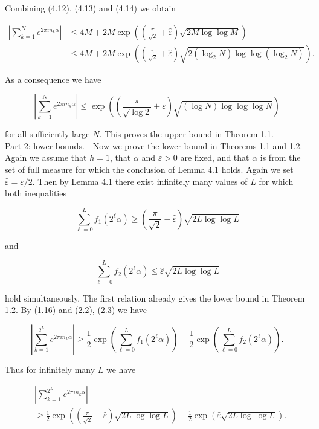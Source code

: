\documentclass[10pt]{article}
\begin{document}
Combining (4.12), (4.13) and (4.14) we obtain

$$
\begin{aligned}
\left|\sum_{k=1}^{N} e^{2 \pi i n_{k} \alpha}\right| & \leqslant 4 M+2 M \exp \left(\left(\frac{\pi}{\sqrt{2}}+\hat{\varepsilon}\right) \sqrt{2 M \log \log M}\right) \\
& \leqslant 4 M+2 M \exp \left(\left(\frac{\pi}{\sqrt{2}}+\hat{\varepsilon}\right) \sqrt{2\left(\log _{2} N\right) \log \log \left(\log _{2} N\right)}\right) .
\end{aligned}
$$

As a consequence we have

$$
\left|\sum_{k=1}^{N} e^{2 \pi i n_{k} \alpha}\right| \leqslant \exp \left(\left(\frac{\pi}{\sqrt{\log 2}}+\varepsilon\right) \sqrt{(\log N) \log \log \log N}\right)
$$

for all sufficiently large $N$. This proves the upper bound in Theorem 1.1.\\
Part 2: lower bounds. - Now we prove the lower bound in Theorems 1.1 and 1.2. Again we assume that $h=1$, that $\alpha$ and $\varepsilon>0$ are fixed, and that $\alpha$ is from the set of full measure for which the conclusion of Lemma 4.1 holds. Again we set $\hat{\varepsilon}=\varepsilon / 2$. Then by Lemma 4.1 there exist infinitely many values of $L$ for which both inequalities

$$
\sum_{\ell=0}^{L} f_{1}\left(2^{\ell} \alpha\right) \geqslant\left(\frac{\pi}{\sqrt{2}}-\hat{\varepsilon}\right) \sqrt{2 L \log \log L}
$$

and

$$
\sum_{\ell=0}^{L} f_{2}\left(2^{\ell} \alpha\right) \leqslant \hat{\varepsilon} \sqrt{2 L \log \log L}
$$

hold simultaneously. The first relation already gives the lower bound in Theorem 1.2. By (1.16) and (2.2), (2.3) we have

$$
\left|\sum_{k=1}^{2^{L}} e^{2 \pi i n_{k} \alpha}\right| \geqslant \frac{1}{2} \exp \left(\sum_{\ell=0}^{L} f_{1}\left(2^{\ell} \alpha\right)\right)-\frac{1}{2} \exp \left(\sum_{\ell=0}^{L} f_{2}\left(2^{\ell} \alpha\right)\right) .
$$

Thus for infinitely many $L$ we have


\begin{align*}
& \left|\sum_{k=1}^{2^{L}} e^{2 \pi i n_{k} \alpha}\right|  \tag{4.15}\\
& \geqslant \frac{1}{2} \exp \left(\left(\frac{\pi}{\sqrt{2}}-\hat{\varepsilon}\right) \sqrt{2 L \log \log L}\right)-\frac{1}{2} \exp (\hat{\varepsilon} \sqrt{2 L \log \log L}) .
\end{align*}
\end{document}
